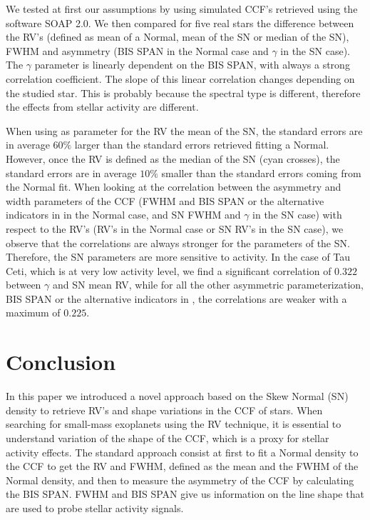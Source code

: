 \documentclass[11pt, oneside]{article}
\def\kms{\hbox{\,km\,s$^{-1}$}}       %
\begin{document}
We tested at first our assumptions by using simulated CCF's retrieved using the software SOAP 2.0. We then compared for five real stars the difference between the RV's (defined as mean of a Normal, mean of the SN or median of the SN), FWHM and asymmetry (BIS SPAN in the Normal case and $\gamma$ in the SN case). The $\gamma$ parameter is linearly dependent on the BIS SPAN, with always a strong correlation coefficient. 
The slope of this linear correlation changes depending on the studied star. This is probably because the spectral type is different, therefore the effects from stellar activity are different.

When using as parameter for the RV the mean of the SN, the standard errors are in average $60\%$ larger than the standard errors retrieved fitting a Normal. However, once the RV is defined as the median of the SN (cyan crosses), the standard errors are in average $10\%$ smaller than the standard errors coming from the Normal fit. When looking at the correlation between the asymmetry and width parameters of the CCF (FWHM and BIS SPAN or the alternative indicators in \citet{Figueira-2013} in the Normal case, and SN FWHM and $\gamma$ in the SN case) with respect to the RV's (RV's in the Normal case or SN RV's in the SN case), we observe that the correlations are always stronger for the parameters of the SN. Therefore, the SN parameters are more sensitive to activity. In the case of Tau Ceti, which is at very low activity level, we find a significant correlation of $0.322$ between $\gamma$ and SN mean RV, while for all the other asymmetric parameterization, BIS SPAN or the alternative indicators in \citet{Figueira-2013}, the correlations are weaker with a maximum of 0.$225$.

\section{Conclusion} \label{sec:conclu}

In this paper we introduced a novel approach based on the Skew Normal (SN) density to retrieve RV's and shape variations in the CCF of stars. When searching for small-mass exoplanets using the RV technique, it is essential to understand variation of the shape of the CCF, which is a proxy for stellar activity effects. The standard approach consist at first to fit a Normal density to the CCF to get the RV and FWHM, defined as the mean and the FWHM of the Normal density, and then to measure the asymmetry of the CCF by calculating the BIS SPAN. FWHM and BIS SPAN give us information on the line shape that are used to probe stellar activity signals. 
\end{document}
